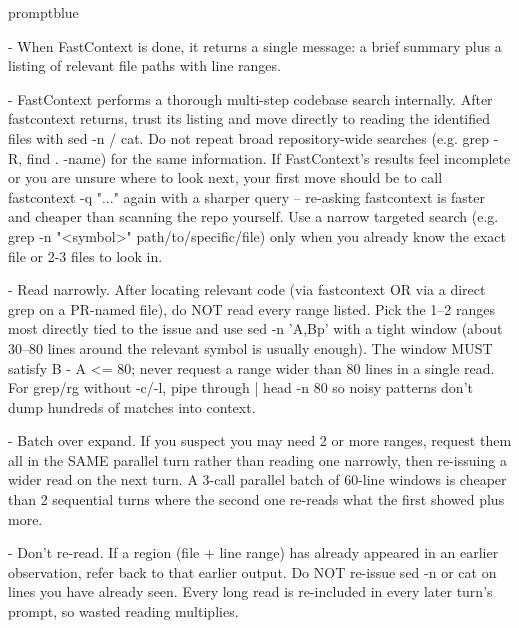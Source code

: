 \documentclass{llmxive}
\begin{document}
\begin{promptbox}{promptblue}
{- When FastContext is done, it returns a single message: a brief summary plus a listing of relevant file paths with line ranges.\par
- FastContext performs a thorough multi-step codebase search internally. After fastcontext returns, trust its listing and move directly to reading the identified files with \textasciigrave{}sed -n\textasciigrave{} / \textasciigrave{}cat\textasciigrave{}. Do not repeat broad repository-wide searches (e.g. \textasciigrave{}grep -R\textasciigrave{}, \textasciigrave{}find . -name\textasciigrave{}) for the same information. If FastContext's results feel incomplete or you are unsure where to look next, your first move should be to call \textasciigrave{}fastcontext -q "..."\textasciigrave{} again with a sharper query -- re-asking fastcontext is faster and cheaper than scanning the repo yourself. Use a narrow targeted search (e.g. \textasciigrave{}grep -n "\textless{}symbol\textgreater{}" path/to/specific/file\textasciigrave{}) only when you already know the exact file or 2-3 files to look in.\par
- Read narrowly. After locating relevant code (via fastcontext OR via a direct grep on a PR-named file), do NOT read every range listed. Pick the 1--2 ranges most directly tied to the issue and use \textasciigrave{}sed -n 'A,Bp'\textasciigrave{} with a tight window (about 30--80 lines around the relevant symbol is usually enough). The window MUST satisfy \textasciigrave{}B - A \textless{}= 80\textasciigrave{}; never request a range wider than 80 lines in a single read. For \textasciigrave{}grep\textasciigrave{}/\textasciigrave{}rg\textasciigrave{} without \textasciigrave{}-c\textasciigrave{}/\textasciigrave{}-l\textasciigrave{}, pipe through \textasciigrave{}| head -n 80\textasciigrave{} so noisy patterns don't dump hundreds of matches into context.\par
- Batch over expand. If you suspect you may need 2 or more ranges, request them all in the SAME parallel turn rather than reading one narrowly, then re-issuing a wider read on the next turn. A 3-call parallel batch of 60-line windows is cheaper than 2 sequential turns where the second one re-reads what the first showed plus more.\par
- Don't re-read. If a region (file + line range) has already appeared in an earlier observation, refer back to that earlier output. Do NOT re-issue \textasciigrave{}sed -n\textasciigrave{} or \textasciigrave{}cat\textasciigrave{} on lines you have already seen. Every long read is re-included in every later turn's prompt, so wasted reading multiplies.\par
}
\end{promptbox}
\end{document}
